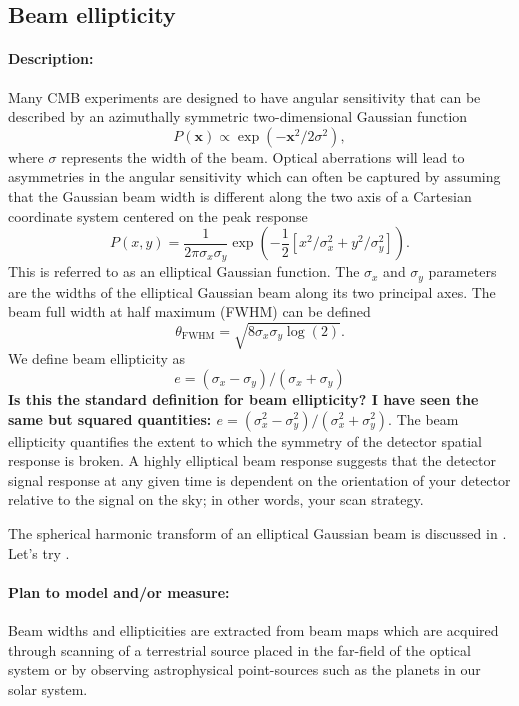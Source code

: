 \subsection{Beam ellipticity}

\paragraph{Description:}
Many CMB experiments are designed to have angular sensitivity that can be described by an azimuthally symmetric two-dimensional Gaussian function
\begin{equation} 
P (\mathbf{x}) \propto \exp (-\mathbf{x} ^2/2\sigma ^2),
\end{equation}
where $\sigma$ represents the width of the beam. Optical aberrations will lead to asymmetries in the angular sensitivity which can often be captured by assuming that the Gaussian beam width is different along the two axis of a Cartesian coordinate system centered on the peak response
\begin{equation}
P (x,y) = \frac{1}{2\pi \sigma_x \sigma_y} \exp (-\frac{1}{2}[x^2/\sigma ^2_x + y^2/\sigma ^2_y]).
\end{equation}
This is referred to as an elliptical Gaussian function. The $\sigma_x$ and $\sigma_y$ parameters are the widths of the elliptical Gaussian beam along its two principal axes. The beam full width at half maximum (FWHM) can be defined 
\begin{equation}
\theta _\mathrm{FWHM} = \sqrt{8\sigma_x \sigma_y\log{(2)}}. 
\end{equation}
We define beam ellipticity as 
\begin{equation}
e = (\sigma_x-\sigma_y)/(\sigma_x+\sigma_y)
\end{equation}
\textbf{Is this the standard definition for beam ellipticity? I have seen the same but squared quantities: $e = (\sigma_x^2-\sigma_y^2)/(\sigma_x^2+\sigma_y^2)$}. The beam ellipticity quantifies the extent to which the symmetry of the detector spatial response is broken. A highly elliptical beam response suggests that the detector signal response at any given time is dependent on the orientation of your detector relative to the signal on the sky; in other words, your scan strategy.

The spherical harmonic transform of an elliptical Gaussian beam is discussed in \cite{Souradeep2001}. Let's try \cite{Takahashi2010}.

\paragraph{Plan to model and/or measure:}
Beam widths and ellipticities are extracted from beam maps which are acquired through scanning of a terrestrial source placed in the far-field of the optical system or by observing astrophysical point-sources such as the planets in our solar system. 

